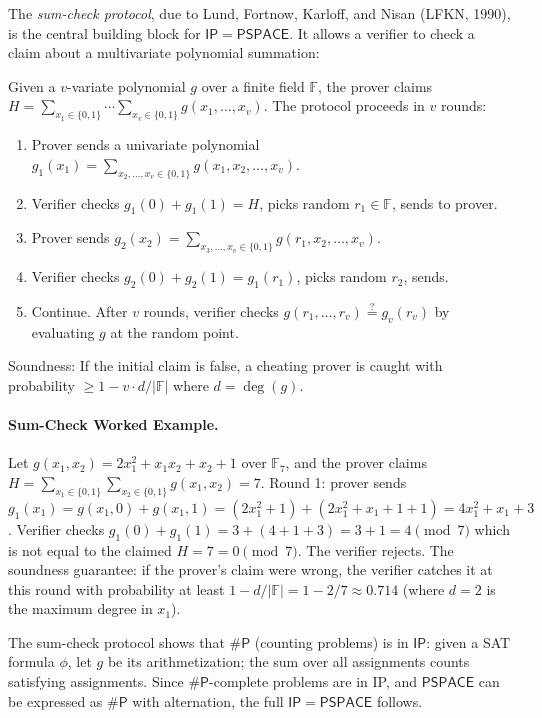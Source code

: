 The \emph{sum-check protocol}, due to Lund, Fortnow, Karloff, and Nisan (LFKN, 1990), is the central building block for $\mathsf{IP} = \mathsf{PSPACE}$. It allows a verifier to check a claim about a multivariate polynomial summation:

\begin{definition}
Given a $v$-variate polynomial $g$ over a finite field $\mathbb{F}$, the prover claims $H = \sum_{x_1 \in \{0,1\}} \cdots \sum_{x_v \in \{0,1\}} g(x_1,\dots,x_v)$. The protocol proceeds in $v$ rounds:
\begin{enumerate}
\item Prover sends a univariate polynomial $g_1(x_1) = \sum_{x_2,\dots,x_v \in \{0,1\}} g(x_1, x_2, \dots, x_v)$.
\item Verifier checks $g_1(0) + g_1(1) = H$, picks random $r_1 \in \mathbb{F}$, sends to prover.
\item Prover sends $g_2(x_2) = \sum_{x_3,\dots,x_v \in \{0,1\}} g(r_1, x_2, \dots, x_v)$.
\item Verifier checks $g_2(0) + g_2(1) = g_1(r_1)$, picks random $r_2$, sends.
\item Continue. After $v$ rounds, verifier checks $g(r_1,\dots,r_v) \stackrel{?}{=} g_v(r_v)$ by evaluating $g$ at the random point.
\end{enumerate}
Soundness: If the initial claim is false, a cheating prover is caught with probability $\ge 1 - v \cdot d / |\mathbb{F}|$ where $d = \deg(g)$.
\end{definition}

\paragraph{Sum-Check Worked Example.} Let $g(x_1,x_2) = 2x_1^2 + x_1 x_2 + x_2 + 1$ over $\mathbb{F}_7$, and the prover claims $H = \sum_{x_1 \in \{0,1\}} \sum_{x_2 \in \{0,1\}} g(x_1,x_2) = 7$. Round 1: prover sends $g_1(x_1) = g(x_1,0) + g(x_1,1) = (2x_1^2 + 1) + (2x_1^2 + x_1 + 1 + 1) = 4x_1^2 + x_1 + 3$. Verifier checks $g_1(0)+g_1(1) = 3 + (4+1+3) = 3+1 = 4 \pmod{7}$ which is not equal to the claimed $H=7=0\pmod{7}$. The verifier rejects. The soundness guarantee: if the prover's claim were wrong, the verifier catches it at this round with probability at least $1 - d/|\mathbb{F}| = 1 - 2/7 \approx 0.714$ (where $d=2$ is the maximum degree in $x_1$).

The sum-check protocol shows that $\mathsf{\#P}$ (counting problems) is in $\mathsf{IP}$: given a SAT formula $\phi$, let $g$ be its arithmetization; the sum over all assignments counts satisfying assignments. Since $\mathsf{\#P}$-complete problems are in IP, and $\mathsf{PSPACE}$ can be expressed as $\mathsf{\#P}$ with alternation, the full $\mathsf{IP} = \mathsf{PSPACE}$ follows.

